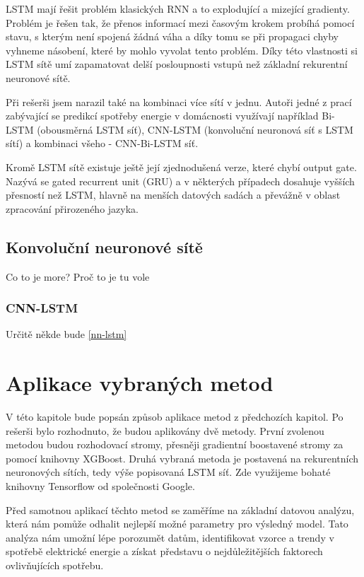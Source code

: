 \documentclass[FM,BP,fonts]{tulthesis}
\begin{document}
LSTM mají řešit problém klasických RNN a to explodující a mizející gradienty. Problém je řešen tak, že přenos informací mezi časovým krokem probíhá pomocí stavu, s kterým není spojená žádná váha a díky tomu se při propagaci chyby vyhneme násobení, které by mohlo vyvolat tento problém. Díky této vlastnosti si LSTM sítě umí zapamatovat delší posloupnosti vstupů než základní rekurentní neuronové sítě.

Při rešerši jsem narazil také na kombinaci více sítí v jednu. Autoři jedné z prací zabývající se predikcí spotřeby energie v domácnosti \cite{cnn-bi-lstm}	 využívají například Bi-LSTM (obousměrná LSTM síť), CNN-LSTM (konvoluční neuronová síť s LSTM sítí) a kombinaci všeho - CNN-Bi-LSTM síť.

Kromě LSTM sítě existuje ještě její zjednodušená verze, které chybí output gate. Nazývá se gated recurrent unit (GRU) a v některých případech dosahuje vyšších přesností než LSTM, hlavně na menších datových sadách a převážně v oblast zpracování přirozeného jazyka. \cite{kynych2018vyuziti}

\newpage
\section{Konvoluční neuronové sítě}
Co to je more? Proč to je tu vole

\subsection{CNN-LSTM}
Určitě někde bude \ref{nn-lstm}

\chapter{Aplikace vybraných metod}
V této kapitole bude popsán způsob aplikace metod z předchozích kapitol. Po rešerši bylo rozhodnuto, že budou aplikovány dvě metody. První zvolenou metodou budou rozhodovací stromy, přesněji gradientní boostavené stromy za pomocí knihovny XGBoost.
Druhá vybraná metoda je postavená na rekurentních neuronových sítích, tedy výše popisovaná LSTM síť. Zde využijeme bohaté knihovny Tensorflow od společnosti Google.

Před samotnou aplikací těchto metod se zaměříme na základní datovou analýzu, která nám pomůže odhalit nejlepší možné parametry pro výsledný model. Tato analýza nám umožní lépe porozumět datům, identifikovat vzorce a trendy v spotřebě elektrické energie a získat představu o nejdůležitějších faktorech ovlivňujících spotřebu.
\end{document}
